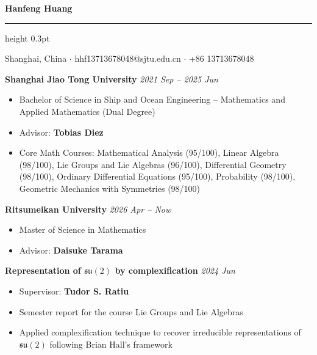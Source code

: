 \documentclass[12pt]{article}
\begin{document}
\begin{center}
    {\fontsize{18}{22}\selectfont \textbf{Hanfeng Huang}}\\ 
    \vspace{0.15cm}
    {\color{gray}\hrule height 0.3pt}
\end{center}

\begin{center}
    \footnotesize Shanghai, China $\cdot$ hhf13713678048@sjtu.edu.cn $\cdot$ +86 13713678048
\end{center}

\vspace{0.4cm}

\vspace{0.2cm}

\noindent\textbf{Shanghai Jiao Tong University} \hfill \textit{2021 Sep -- 2025 Jun}
\vspace{0.05cm}
\begin{itemize}[noitemsep, topsep=0pt, partopsep=0pt, parsep=0pt, leftmargin=0.3cm]
  \item Bachelor of Science in Ship and Ocean Engineering -- Mathematics and Applied Mathematics (Dual Degree)
  \item Advisor: \textbf{Tobias Diez}
  \item Core Math Courses: Mathematical Analysis (95/100), Linear Algebra (98/100), Lie Groups and Lie Algebras
  (96/100), Differential Geometry (98/100), Ordinary Differential Equations (95/100), Probability (98/100), Geometric Mechanics with Symmetries (98/100)
\end{itemize}

\noindent\textbf{Ritsumeikan University} \hfill \textit{2026 Apr -- Now}
\vspace{0.1cm}
\begin{itemize}[noitemsep, topsep=0pt, partopsep=0pt, parsep=0pt, leftmargin=0.3cm]
  \item Master of Science in Mathematics
  \item Advisor: \textbf{Daisuke Tarama}
\end{itemize}

\vspace{0.25cm}

\vspace{0.2cm}

\noindent\textbf{Representation of $\mathfrak{su}(2)$ by complexification} \hfill \textit{2024 Jun}
\vspace{0.1cm}
\begin{itemize}[noitemsep, topsep=0pt, partopsep=0pt, parsep=0pt, leftmargin=0.3cm]
  \item Supervisor: \textbf{Tudor S. Ratiu}
  \item Semester report for the course Lie Groups and Lie Algebras
  \item Applied complexification technique to recover irreducible representations of $\mathfrak{su}(2)$ following Brian Hall's framework
\end{itemize}
\end{document}
